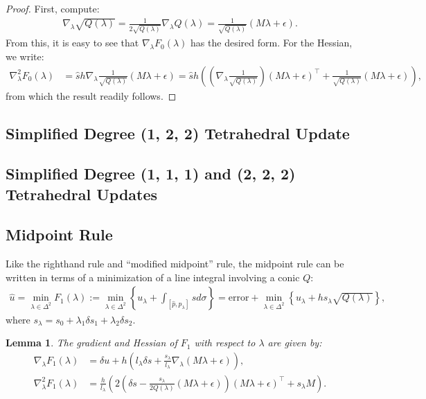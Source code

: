 \documentclass{article}
\newcommand{\curlyb}[1]{\left\{#1\right\}}
\newcommand{\parens}[1]{\left(#1\right)}
\newtheorem{lemma}{Lemma}
\begin{document}
\begin{proof}
  First, compute:
  \begin{align*}
    \nabla_\lambda \sqrt{Q(\lambda)} = \frac{1}{2 \sqrt{Q(\lambda)}} \nabla_\lambda Q(\lambda) = \frac{1}{\sqrt{Q(\lambda)}}\parens{M\lambda + \epsilon}.
  \end{align*}
  From this, it is easy to see that $\nabla_\lambda F_0(\lambda)$ has
  the desired form. For the Hessian, we write:
  \begin{align*}
    \nabla_\lambda^2 F_0(\lambda)
    &= \hat{s}h \nabla_\lambda \frac{1}{\sqrt{Q(\lambda)}}{(M\lambda + \epsilon)} = \hat{s}h \parens{\parens{\nabla_\lambda \frac{1}{\sqrt{Q(\lambda)}}} {(M\lambda + \epsilon)}^\top + \frac{1}{\sqrt{Q(\lambda)}} {(M\lambda + \epsilon)}},
  \end{align*}
  from which the result readily follows.
\end{proof}

\subsection{Simplified Degree (1, 2, 2) Tetrahedral Update}

\subsection{Simplified Degree (1, 1, 1) and (2, 2, 2) Tetrahedral Updates}

\subsection{Midpoint Rule}

Like the righthand rule and ``modified midpoint'' rule, the midpoint
rule can be written in terms of a minimization of a line integral
involving a conic $Q$:
\begin{align*}
  \hat{u} = \min_{\lambda \in \Delta^2} F_1(\lambda) := \min_{\lambda \in \Delta^2} \curlyb{u_\lambda + \int_{[\hat{p}, p_\lambda]} sd\sigma} = \mbox{error} + \min_{\lambda \in \Delta^2} \curlyb{u_\lambda + h s_\lambda \sqrt{Q(\lambda)}},
\end{align*}
where $s_\lambda = s_0 + \lambda_1 \delta s_1 + \lambda_2 \delta s_2$.

\begin{lemma}
  The gradient and Hessian of $F_1$ with respect to $\lambda$ are given by:
  \begin{align*}
    \nabla_\lambda F_1(\lambda) &= \delta u + h \parens{l_\lambda \delta s + \frac{s_\lambda}{l_\lambda} \nabla_\lambda \parens{M\lambda + \epsilon}}, \\
    \nabla^2_\lambda F_1(\lambda) &= \frac{h}{l_\lambda} \parens{2\parens{\delta s - \frac{s_\lambda}{2Q(\lambda)}\parens{M\lambda + \epsilon}}\parens{M\lambda + \epsilon}^\top + s_\lambda M}.
  \end{align*}
\end{lemma}
\end{document}
